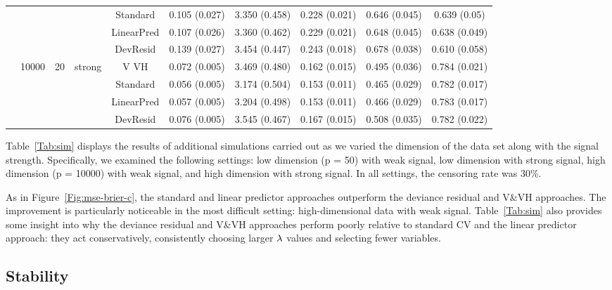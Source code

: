 \begin{table}[htb]
\begin{tabular}[t]{cccccccccc}
    &    &   &     & Standard  & 0.105 (0.027) & 3.350 (0.458) & 0.228 (0.021) & 0.646 (0.045) & 0.639 (0.05) \\
    &    &   &     & LinearPred  & 0.107 (0.026) & 3.360 (0.462) & 0.229 (0.021) & 0.648 (0.045) & 0.638 (0.049) \\
    &    &   &     & DevResid  & 0.139 (0.027) & 3.454 (0.447) & 0.243 (0.018) & 0.678 (0.038) & 0.610 (0.058) \\
\addlinespace
500 & 10000 & 20 & strong & V VH  & 0.072 (0.005) & 3.469 (0.480) & 0.162 (0.015) & 0.495 (0.036) & 0.784 (0.021) \\
    &    &   &     & Standard  & 0.056 (0.005) & 3.174 (0.504) & 0.153 (0.011) & 0.465 (0.029) & 0.782 (0.017) \\
    &    &   &     & LinearPred  & 0.057 (0.005) & 3.204 (0.498) & 0.153 (0.011) & 0.466 (0.029) & 0.783 (0.017) \\
    &    &   &     & DevResid  & 0.076 (0.005) & 3.545 (0.467) & 0.167 (0.015) & 0.508 (0.035) & 0.782 (0.022) \\
\bottomrule
\end{tabular}
\end{table}

Table~\ref{Tab:sim} displays the results of additional simulations carried out as we varied the dimension of the data set along with the signal strength.  Specifically, we examined the following settings: low dimension (p = 50) with weak signal, low dimension with strong signal, high dimension (p = 10000) with weak signal, and high dimension with strong signal. In all settings, the censoring rate was 30\%.

As in Figure~\ref{Fig:mse-brier-c}, the standard and linear predictor approaches outperform the deviance residual and V\&VH approaches.  The improvement is particularly noticeable in the most difficult setting: high-dimensional data with weak signal.  Table~\ref{Tab:sim} also provides some insight into why the deviance residual and V\&VH approaches perform poorly relative to standard CV and the linear predictor approach: they act conservatively, consistently choosing larger $\lambda$ values and selecting fewer variables. %

\subsection {Stability}
\label{Sec:stability}
  
